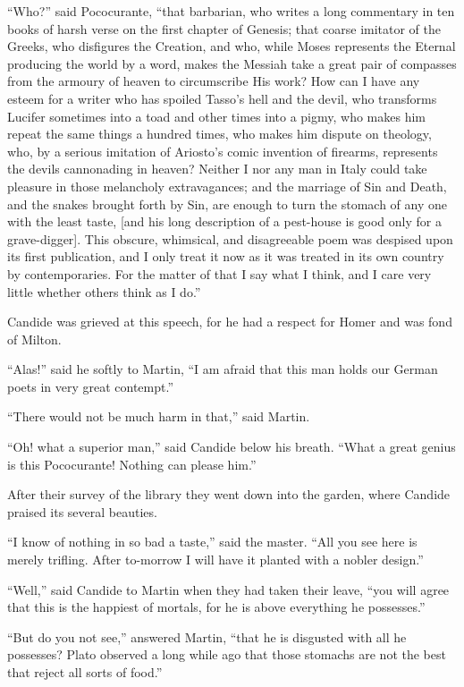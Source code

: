 ``Who?'' said Pococurante, ``that barbarian, who writes a long commentary in ten books of harsh verse on the first chapter of Genesis; that coarse imitator of the Greeks, who disfigures the Creation, and who, while Moses represents the Eternal producing the world by a word, makes the Messiah take a great pair of compasses from the armoury of heaven to circumscribe His work? How can I have any esteem for a writer who has spoiled Tasso's hell and the devil, who transforms Lucifer sometimes into a toad and other times into a pigmy, who makes him repeat the same things a hundred times, who makes him dispute on theology, who, by a serious imitation of Ariosto's comic invention of firearms, represents the devils cannonading in heaven? Neither I nor any man in Italy could take pleasure in those melancholy extravagances; and the marriage of Sin and Death, and the snakes brought forth by Sin, are enough to turn the stomach of any one with the least taste, [and his long description of a pest-house is good only for a grave-digger]. This obscure, whimsical, and disagreeable poem was despised upon its first publication, and I only treat it now as it was treated in its own country by contemporaries. For the matter of that I say what I think, and I care very little whether others think as I do.''

Candide was grieved at this speech, for he had a respect for Homer and was fond of Milton.

``Alas!'' said he softly to Martin, ``I am afraid that this man holds our German poets in very great contempt.''

``There would not be much harm in that,'' said Martin.

``Oh! what a superior man,'' said Candide below his breath. ``What a great genius is this Pococurante! Nothing can please him.''

After their survey of the library they went down into the garden, where Candide praised its several beauties.

``I know of nothing in so bad a taste,'' said the master. ``All you see here is merely trifling. After to-morrow I will have it planted with a nobler design.''

``Well,'' said Candide to Martin when they had taken their leave, ``you will agree that this is the happiest of mortals, for he is above everything he possesses.''

``But do you not see,'' answered Martin, ``that he is disgusted with all he possesses? Plato observed a long while ago that those stomachs are not the best that reject all sorts of food.''

